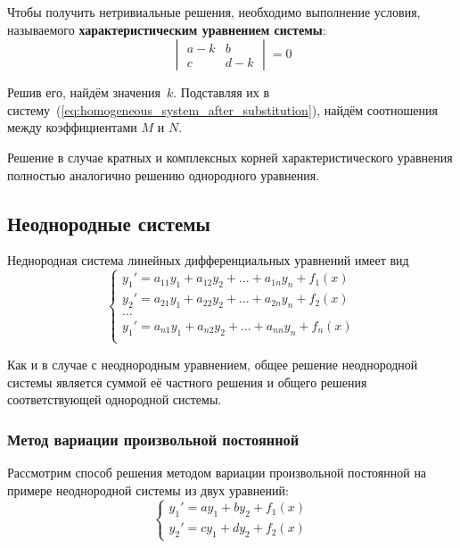 Чтобы получить нетривиальные решения, необходимо выполнение условия, называемого \textbf{характеристическим уравнением системы}:
\begin{equation*}
\begin{vmatrix}
a - k & b \\
c & d - k
\end{vmatrix} = 0
\end{equation*}

Решив его, найдём значения~$k$.
Подставляя их в систему~(\ref*{eq:homogeneous_system_after_substitution}), найдём соотношения между коэффициентами $M$ и $N$.

Решение в случае кратных и комплексных корней характеристического уравнения полностью аналогично решению однородного уравнения.

\subsection{Неоднородные системы}
Неднородная система линейных дифференциальных уравнений имеет вид
\begin{equation*}
\begin{cases}
y_1' = a_{11} y_1 + a_{12} y_2 + \ldots + a_{1n} y_n + f_1(x) \\
y_2' = a_{21} y_1 + a_{22} y_2 + \ldots + a_{2n} y_n + f_2(x) \\
\ldots \\
y_1' = a_{n1} y_1 + a_{n2} y_2 + \ldots + a_{nn} y_n + f_n(x) \\
\end{cases}
\end{equation*}

Как и в случае с неоднородным уравнением, общее решение неоднородной системы является суммой её частного решения и общего решения соответствующей однородной системы.

\subsubsection{Метод вариации произвольной постоянной}
 Рассмотрим способ решения методом вариации произвольной постоянной на примере неоднородной системы из двух уравнений:
\begin{equation*}
\begin{cases}
y_1' = ay_1 + by_2 + f_1(x) \\
y_2' = cy_1 + dy_2 + f_2(x)
\end{cases}
\end{equation*}

